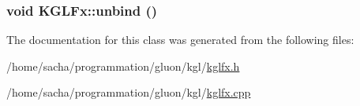 \hypertarget{class_k_g_l_fx_b3eaa1c6e1c562b43374bc4d1b670967}{
\subsubsection[{unbind}]{\setlength{\rightskip}{0pt plus 5cm}void KGLFx::unbind ()}}
\label{class_k_g_l_fx_b3eaa1c6e1c562b43374bc4d1b670967}




The documentation for this class was generated from the following files:\begin{CompactItemize}
\item 
/home/sacha/programmation/gluon/kgl/\hyperlink{kglfx_8h}{kglfx.h}\item 
/home/sacha/programmation/gluon/kgl/\hyperlink{kglfx_8cpp}{kglfx.cpp}\end{CompactItemize}
